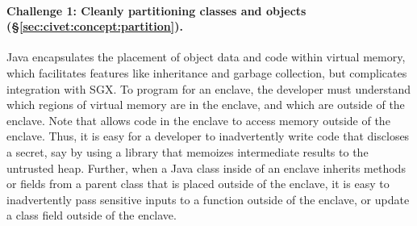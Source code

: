 




\paragraph{\bf Challenge 1: Cleanly partitioning classes and objects (\S\ref{sec:civet:concept:partition}).}
Java encapsulates the placement of object data and code within virtual memory, which facilitates features
like inheritance and garbage collection, but complicates integration with SGX.
To program for an \sgx{} enclave, the developer must understand which regions of virtual memory 
are in the enclave, and which are outside of the enclave.
Note that \sgx{} allows code in the enclave to access memory
outside of the enclave.  Thus, it is easy for a developer to inadvertently write
code that discloses a secret, say by using a library that memoizes intermediate results to the untrusted heap.
Further, when a Java class inside of an enclave inherits methods or fields
from a parent class that is placed outside of the enclave, it is easy to 
inadvertently pass sensitive inputs to a function outside of the enclave,
or update a class field outside of the enclave.

